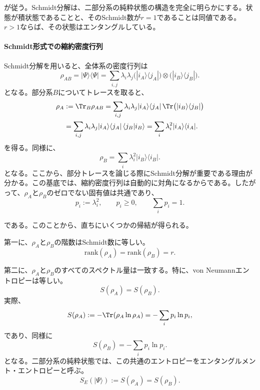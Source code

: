 \documentclass[a4paper,11pt,oneside]{article}
\theoremstyle{definition}
\numberwithin{equation}{section}
\begin{document}
が従う。Schmidt分解は、二部分系の純粋状態の構造を完全に明らかにする。状態が積状態であることと、そのSchmidt数が$r=1$であることは同値である。$r>1$ならば、その状態はエンタングルしている。



\paragraph{Schmidt形式での縮約密度行列}



Schmidt分解を用いると、全体系の密度行列は
\begin{equation}
\rho_{AB}
=
|\Psi\rangle\langle\Psi|
=
\sum_{i,j} \lambda_i \lambda_j
\bigl(|i_A\rangle\langle j_A|\bigr)
\otimes
\bigl(|i_B\rangle\langle j_B|\bigr) .
\end{equation}
となる。部分系$B$についてトレースを取ると、
\begin{align}
\rho_A
&:= \Tr_B \rho_{AB}=
\sum_{i,j} \lambda_i \lambda_j
|i_A\rangle\langle j_A| \,
\Tr\bigl(|i_B\rangle\langle j_B|\bigr)
\nonumber\\
&=
\sum_{i,j} \lambda_i \lambda_j
|i_A\rangle\langle j_A| \,
\langle j_B|i_B\rangle=
\sum_i \lambda_i^2 |i_A\rangle\langle i_A| .
\end{align}
を得る。同様に、
\begin{equation}
\rho_B = \sum_i \lambda_i^2 |i_B\rangle\langle i_B| .
\end{equation}
となる。ここから、部分トレースを論じる際にSchmidt分解が重要である理由が分かる。この基底では、縮約密度行列は自動的に対角になるからである。したがって、$\rho_A$と$\rho_B$のゼロでない固有値は共通であり、
\begin{equation}
p_i := \lambda_i^2 ,
\qquad
p_i \ge 0,
\qquad
\sum_i p_i = 1 .
\end{equation}


である。このことから、直ちにいくつかの帰結が得られる。



第一に、$\rho_A$と$\rho_B$の階数はSchmidt数に等しい。
\begin{equation}
\mathrm{rank}(\rho_A)=\mathrm{rank}(\rho_B)=r .
\end{equation}


第二に、$\rho_A$と$\rho_B$のすべてのスペクトル量は一致する。特に、von Neumannエントロピーは等しい。
\begin{equation}\label{sameent}
S(\rho_A) = S(\rho_B) .
\end{equation}
実際、
\begin{equation}
S(\rho_A)
:=
-\Tr(\rho_A \ln \rho_A)
=
-\sum_i p_i \ln p_i ,
\end{equation}
であり、同様に
\begin{equation}
S(\rho_B)
=
-\sum_i p_i \ln p_i .
\end{equation}
となる。二部分系の純粋状態では、この共通のエントロピーをエンタングルメント・エントロピーと呼ぶ。
\begin{equation}
S_E(|\Psi\rangle)
:=
S(\rho_A)
=
S(\rho_B) .
\end{equation}
\end{document}
